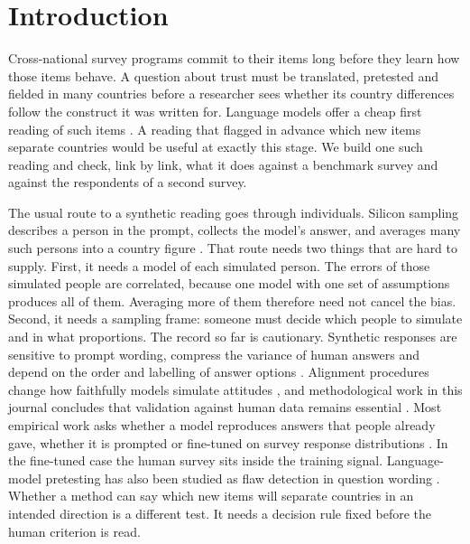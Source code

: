 \section{Introduction}\label{sec:introduction}

Cross-national survey programs commit to their items long before they learn how those items behave. A question about trust must be translated, pretested and fielded in many countries before a researcher sees whether its country differences follow the construct it was written for. Language models offer a cheap first reading of such items \citep{argyle2023,horton2023,buskirk2026}. A reading that flagged in advance which new items separate countries would be useful at exactly this stage. We build one such reading and check, link by link, what it does against a benchmark survey and against the respondents of a second survey.

The usual route to a synthetic reading goes through individuals. Silicon sampling describes a person in the prompt, collects the model's answer, and averages many such persons into a country figure \citep{argyle2023}. That route needs two things that are hard to supply. First, it needs a model of each simulated person. The errors of those simulated people are correlated, because one model with one set of assumptions produces all of them. Averaging more of them therefore need not cancel the bias. Second, it needs a sampling frame: someone must decide which people to simulate and in what proportions. The record so far is cautionary. Synthetic responses are sensitive to prompt wording, compress the variance of human answers and depend on the order and labelling of answer options \citep{bisbee2024,boelaert2025,wang2025,dominguezolmedo2024}. Alignment procedures change how faithfully models simulate attitudes \citep{lyman2025}, and methodological work in this journal concludes that validation against human data remains essential \citep{kozlowski2025,broska2025}. Most empirical work asks whether a model reproduces answers that people already gave, whether it is prompted \citep{santurkar2023,durmus2024} or fine-tuned on survey response distributions \citep{cao2025,suh2025}. In the fine-tuned case the human survey sits inside the training signal. Language-model pretesting has also been studied as flaw detection in question wording \citep{sturgis2026}. Whether a method can say which new items will separate countries in an intended direction is a different test. It needs a decision rule fixed before the human criterion is read.

